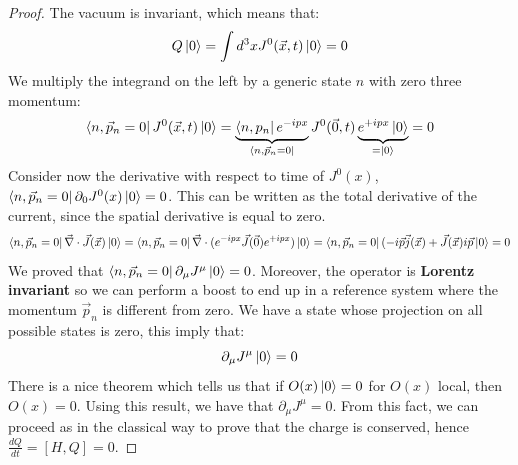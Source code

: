 \documentclass[../main.tex]{subfiles}
\begin{document}
\begin{proof}
The vacuum is invariant, which means that:
\[
Q\ket{0}=\int d^3xJ^0(\Vec{x},t)\ket{0}=0
\]
We multiply the integrand on the left by a generic state $n$ with zero three momentum:
\[
\bra{n,\vec{p}_n=0}J^0(\Vec{x},t)\ket{0}=\underbrace{\bra{n,p_n}e^{-ipx}}_{\bra{n,\Vec{p}_n=0}}J^0(\Vec{0},t)\underbrace{e^{+ipx}\ket{0}}_{=\ket{0}}=0
\]
Consider now the derivative with respect to time of $J^0(x)$,\\
$\bra{n,\vec{p}_n=0}\partial_0J^0(x)\ket{0}=0$. This can be written as the total derivative of the current, since the spatial derivative is equal to zero.
\[
\bra{n,\vec{p}_n=0}\Vec{\nabla}\cdot\Vec{J}(\Vec{x})\ket{0}=\bra{n,\vec{p}_n=0}\Vec{\nabla}\cdot(e^{-ipx}\Vec{J}(\Vec{0})e^{+ipx})\ket{0}=\bra{n,\vec{p}_n=0}(-i\Vec{p}\Vec{j}(\Vec{x})+\Vec{J}(\Vec{x})i\Vec{p}\ket{0}=0
\]
We proved that $\bra{n,\vec{p}_n=0}\partial_\mu J^\mu\ket{0}=0$. Moreover, the operator is \textbf{Lorentz invariant} so we can perform a boost to end up in a reference system where the momentum $\vec{p}_n$ is different from zero. We have a state whose projection on all possible states is zero, this imply that:
\[
\partial_\mu J^\mu\ket{0}=0
\]
There is a nice theorem which tells us that if $O(x)\ket{0}=0$ for $O(x)$ local, then $O(x)=0$. Using this result, we have that $\partial_\mu J^\mu=0$. From this fact, we can proceed as in the classical way to prove that the charge is conserved, hence $\frac{dQ}{dt}=[H,Q]=0$.
\end{proof}
\end{document}
